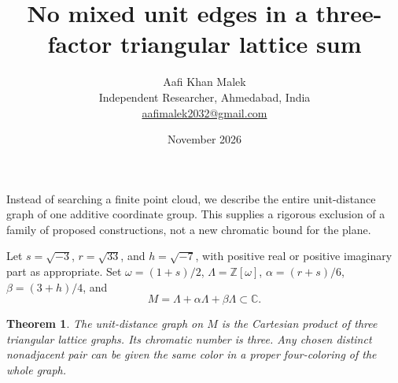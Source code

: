 \documentclass[11pt,letterpaper]{article}
\title{No mixed unit edges in a three-factor triangular lattice sum}
\author{Aafi Khan Malek\\\small Independent Researcher, Ahmedabad, India\\
\small\href{mailto:aafimalek2032@gmail.com}{aafimalek2032@gmail.com}}
\date{November 2026}
\newtheorem{theorem}{Theorem}
\begin{document}
\maketitle
Instead of searching a finite point cloud, we describe the entire
unit-distance graph of one additive coordinate group. This supplies
a rigorous exclusion of a family of proposed constructions, not
a new chromatic bound for the plane.

Let \(s=\sqrt{-3}\), \(r=\sqrt{33}\), and \(h=\sqrt{-7}\),
with positive real or positive imaginary part as appropriate.
Set \(\omega=(1+s)/2\), \(\Lambda=\mathbb Z[\omega]\),
\(\alpha=(r+s)/6\), \(\beta=(3+h)/4\), and
\[
 M=\Lambda+\alpha\Lambda+\beta\Lambda\subset\mathbb C.
\]
\begin{theorem}
The unit-distance graph on \(M\) is the Cartesian product of
three triangular lattice graphs. Its chromatic number is three.
Any chosen distinct nonadjacent pair can be given the same color
in a proper four-coloring of the whole graph.
\end{theorem}
\end{document}
